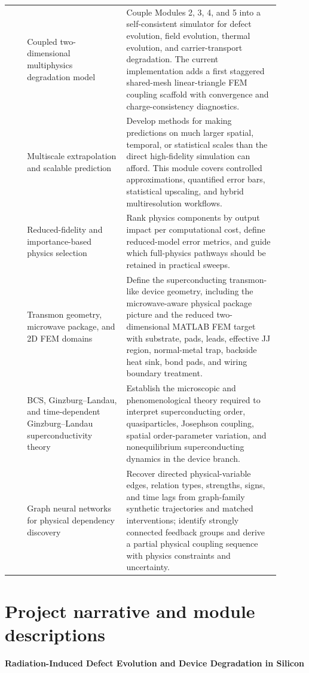 \documentclass[11pt]{article}
\begin{document}
{\begin{longtable}{>{\RaggedRight\arraybackslash}p{0.06\linewidth} >{\RaggedRight\arraybackslash}p{0.33\linewidth} >{\RaggedRight\arraybackslash}p{0.51\linewidth}}
6 & Coupled two-dimensional multiphysics degradation model & Couple Modules 2, 3, 4, and 5 into a self-consistent simulator for defect evolution, field evolution, thermal evolution, and carrier-transport degradation. The current implementation adds a first staggered shared-mesh linear-triangle FEM coupling scaffold with convergence and charge-consistency diagnostics.\\
7 & Multiscale extrapolation and scalable prediction & Develop methods for making predictions on much larger spatial, temporal, or statistical scales than the direct high-fidelity simulation can afford. This module covers controlled approximations, quantified error bars, statistical upscaling, and hybrid multiresolution workflows.\\
8 & Reduced-fidelity and importance-based physics selection & Rank physics components by output impact per computational cost, define reduced-model error metrics, and guide which full-physics pathways should be retained in practical sweeps.\\
9 & Transmon geometry, microwave package, and 2D FEM domains & Define the superconducting transmon-like device geometry, including the microwave-aware physical package picture and the reduced two-dimensional MATLAB FEM target with substrate, pads, leads, effective JJ region, normal-metal trap, backside heat sink, bond pads, and wiring boundary treatment.\\
10 & BCS, Ginzburg--Landau, and time-dependent Ginzburg--Landau superconductivity theory & Establish the microscopic and phenomenological theory required to interpret superconducting order, quasiparticles, Josephson coupling, spatial order-parameter variation, and nonequilibrium superconducting dynamics in the device branch.\\
11 & Graph neural networks for physical dependency discovery & Recover directed physical-variable edges, relation types, strengths, signs, and time lags from graph-family synthetic trajectories and matched interventions; identify strongly connected feedback groups and derive a partial physical coupling sequence with physics constraints and uncertainty.\\
\bottomrule
\end{longtable}
}

\section{Project narrative and module descriptions}
\textbf{Radiation-Induced Defect Evolution and Device Degradation in Silicon}
\end{document}
